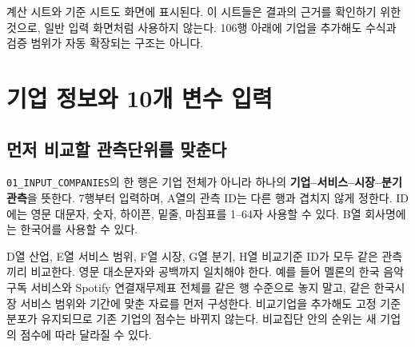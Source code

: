 계산 시트와 기준 시트도 화면에 표시된다. 이 시트들은 결과의 근거를 확인하기 위한 것으로, 일반 입력 화면처럼 사용하지 않는다. 106행 아래에 기업을 추가해도 수식과 검증 범위가 자동 확장되는 구조는 아니다.

\section{기업 정보와 10개 변수 입력}

\subsection{먼저 비교할 관측단위를 맞춘다}

\nolinkurl{01_INPUT_COMPANIES}의 한 행은 기업 전체가 아니라 하나의 \textbf{기업--서비스--시장--분기 관측}을 뜻한다. 7행부터 입력하며, A열의 관측 ID는 다른 행과 겹치지 않게 정한다. ID에는 영문 대문자, 숫자, 하이픈, 밑줄, 마침표를 1--64자 사용할 수 있다. B열 회사명에는 한국어를 사용할 수 있다.

D열 산업, E열 서비스 범위, F열 시장, G열 분기, H열 비교기준 ID가 모두 같은 관측끼리 비교한다. 영문 대소문자와 공백까지 일치해야 한다. 예를 들어 멜론의 한국 음악 구독 서비스와 Spotify 연결재무제표 전체를 같은 행 수준으로 놓지 말고, 같은 한국시장 서비스 범위와 기간에 맞춘 자료를 먼저 구성한다. 비교기업을 추가해도 고정 기준분포가 유지되므로 기존 기업의 점수는 바뀌지 않는다. 비교집단 안의 순위는 새 기업의 점수에 따라 달라질 수 있다.

